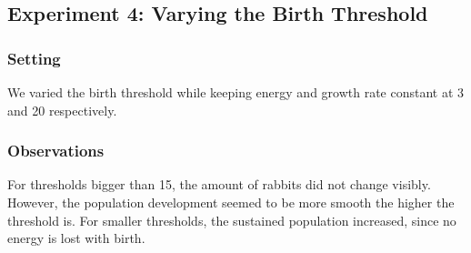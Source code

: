 \documentclass[11pt]{article}
\begin{document}
\subsection{Experiment 4: Varying the Birth Threshold}
\subsubsection{Setting}
We varied the birth threshold while keeping energy and growth rate constant at 3 and 20 respectively.
\subsubsection{Observations}
For thresholds bigger than 15, the amount of rabbits did not change visibly.
However, the population development seemed to be more smooth the higher the threshold is.
For smaller thresholds, the sustained population increased, since no energy is lost with birth.
\end{document}
